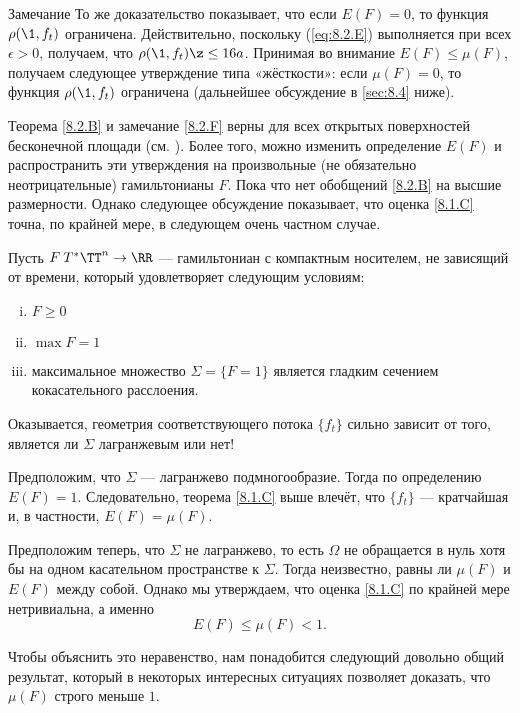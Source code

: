 \begin{thm}{Замечание}\label{8.2.F}
То же доказательство показывает, что если $E (F) = 0$, то функция $\rho (\1, f_t)$ ограничена.
Действительно, поскольку (\ref{eq:8.2.E}) выполняется при всех $\epsilon> 0$, получаем, что $\rho (\1, f_t) \z\le 16a$.
Принимая во внимание $E (F) \le \mu (F)$, получаем следующее утверждение типа «жёсткости»: если $\mu (F) = 0$, то функция $\rho (\1, f_t)$ ограничена (дальнейшее обсуждение в \ref{sec:8.4} ниже).
\end{thm}

Теорема \ref{8.2.B} и замечание \ref{8.2.F} верны для всех открытых поверхностей бесконечной площади (см. \cite{PS}).
Более того, можно изменить определение $E (F)$ и распространить эти утверждения на произвольные (не обязательно неотрицательные) гамильтонианы $F$.
Пока что нет обобщений \ref{8.2.B} на высшие размерности.
Однако следующее обсуждение показывает, что оценка \ref{8.1.C} точна, по крайней мере, в следующем очень частном случае.

Пусть $F\: T^\ast \TT^n \to \RR$ --- гамильтониан с компактным носителем, не зависящий от времени, который удовлетворяет следующим условиям: 
\begin{enumerate}[(i)]
\item $F \ge 0 $
\item $\max F = 1$ 
\item максимальное множество $\Sigma = \{F = 1\}$ является гладким сечением кокасательного расслоения.
\end{enumerate}

Оказывается, геометрия соответствующего потока $\{f_t\}$ сильно зависит от того, является ли $\Sigma$ лагранжевым или нет!

Предположим, что $\Sigma$ --- лагранжево подмногообразие.
Тогда по определению $E (F) = 1$.
Следовательно, теорема \ref{8.1.C} выше влечёт, что $\{f_t\}$ --- кратчайшая и, в частности, $E (F) = \mu (F)$.

Предположим теперь, что $\Sigma$ не лагранжево, то есть $\Omega$ не обращается в нуль хотя бы на одном касательном пространстве к $\Sigma$.
Тогда неизвестно, равны ли $\mu (F)$ и $E (F)$ между собой.
Однако мы утверждаем, что оценка \ref{8.1.C} по крайней мере нетривиальна, а именно 
\begin{equation}
E (F) \le \mu (F) <1.\label{8.2.G}
\end{equation}

Чтобы объяснить это неравенство, нам понадобится следующий довольно общий результат, который в некоторых интересных ситуациях позволяет доказать, что $\mu (F)$ строго меньше $1$.

